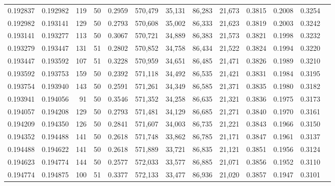 \begin{tabular}{rrrrrrrrrrrrr}
0.192837 & 0.192982 &   119 &  50 &                                     0.2959 & 570,479 &  35,131 &  86,283 &  21,673 & 0.3815 & 0.2008 & 0.3254 \\
0.192982 & 0.193141 &   129 &  50 &                                     0.2793 & 570,608 &  35,002 &  86,333 &  21,623 & 0.3819 & 0.2003 & 0.3242 \\
0.193141 & 0.193277 &   113 &  50 &                                     0.3067 & 570,721 &  34,889 &  86,383 &  21,573 & 0.3821 & 0.1998 & 0.3232 \\
0.193279 & 0.193447 &   131 &  51 &                                     0.2802 & 570,852 &  34,758 &  86,434 &  21,522 & 0.3824 & 0.1994 & 0.3220 \\
0.193447 & 0.193592 &   107 &  51 &                                     0.3228 & 570,959 &  34,651 &  86,485 &  21,471 & 0.3826 & 0.1989 & 0.3210 \\
0.193592 & 0.193753 &   159 &  50 &                                     0.2392 & 571,118 &  34,492 &  86,535 &  21,421 & 0.3831 & 0.1984 & 0.3195 \\
0.193754 & 0.193940 &   143 &  50 &                                     0.2591 & 571,261 &  34,349 &  86,585 &  21,371 & 0.3835 & 0.1980 & 0.3182 \\
0.193941 & 0.194056 &    91 &  50 &                                     0.3546 & 571,352 &  34,258 &  86,635 &  21,321 & 0.3836 & 0.1975 & 0.3173 \\
0.194057 & 0.194208 &   129 &  50 &                                     0.2793 & 571,481 &  34,129 &  86,685 &  21,271 & 0.3840 & 0.1970 & 0.3161 \\
0.194209 & 0.194350 &   126 &  50 &                                     0.2841 & 571,607 &  34,003 &  86,735 &  21,221 & 0.3843 & 0.1966 & 0.3150 \\
0.194352 & 0.194488 &   141 &  50 &                                     0.2618 & 571,748 &  33,862 &  86,785 &  21,171 & 0.3847 & 0.1961 & 0.3137 \\
0.194488 & 0.194622 &   141 &  50 &                                     0.2618 & 571,889 &  33,721 &  86,835 &  21,121 & 0.3851 & 0.1956 & 0.3124 \\
0.194623 & 0.194774 &   144 &  50 &                                     0.2577 & 572,033 &  33,577 &  86,885 &  21,071 & 0.3856 & 0.1952 & 0.3110 \\
0.194774 & 0.194875 &   100 &  51 &                                     0.3377 & 572,133 &  33,477 &  86,936 &  21,020 & 0.3857 & 0.1947 & 0.3101 \\

\end{tabular}
